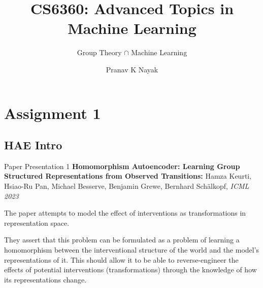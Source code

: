 \documentclass{beamer}
\title{CS6360: Advanced Topics in Machine Learning}
\subtitle{Group Theory $\cap$ Machine Learning}
\author{Pranav K Nayak}
\institute{IIT Hyderabad}
\date{}
\begin{document}
\begin{frame}
  \titlepage
\end{frame}
\section{Assignment 1}
\subsection{HAE Intro}
\begin{frame}{Paper Presentation 1}
  \textbf{Homomorphism Autoencoder: Learning Group Structured Representations from Observed Transitions:}  Hamza Keurti, Hsiao-Ru Pan, Michael Besserve, Benjamin Grewe, Bernhard Sch\"alkopf, \textit{ICML 2023}
  \vspace{5pt}


  The paper attempts to model the effect of interventions as transformations in representation space.

  They assert that this problem can be formulated as a problem of learning a homomorphism between the interventional structure of the world and the model's representations of it. This should allow it to be able to reverse-engineer the effects of potential interventions (transformations) through the knowledge of how its representations change.

\end{frame}
\end{document}
